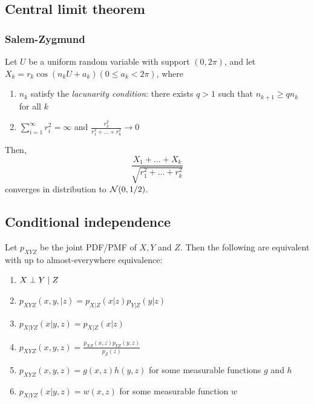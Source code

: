 \documentclass[10pt]{article}
\begin{document}
\subsection{Central limit theorem}
\subsubsection{Salem-Zygmund}
 Let $U$ be a uniform random variable with support $(0, 2\pi)$, and let $X_k = r_k \cos(n_k U + a_k) (0 \leq a_k < 2\pi)$, where 
\begin{enumerate}
    \item $n_k$ satisfy the \emph{lacunarity condition}: there exists $q>1$ such that $n_{k+1} \geq q n_k$ for all $k$ 
    \item $\sum_{i=1}^\infty r_i^2 = \infty$ and $\frac{r_k^2}{r_1^2 + \dots +r_k^2} \to 0$  
\end{enumerate}
Then, 
\begin{equation}
    \frac{X_1 + \dots +X_k}{\sqrt{r_1^2 + \dots + r_k^2}}
\end{equation}
converges in distribution to $\mathcal{N}(0, 1/2)$. 
\subsection{Conditional independence}
 Let $p_{X Y Z}$ be the joint PDF/PMF of $X,Y$ and $Z$. Then the following are equivalent with up to almost-everywhere equivalence:
\begin{enumerate}
    \item $X \perp Y \given Z$
    \item $p_{XY Z } (x,y,|z) = p_{X|Z}(x|z) p_{Y|Z}(y|z)$
    \item $p_{X|Y Z}(x|y,z) = p_{X|Z}(x|z)$
    \item $p_{XYZ}(x,y,z) = \frac{p_{XZ} (x,z) p_{YZ}(y,z)}{p_Z (z)}$
    \item $p_{XYZ} (x,y,z) = g(x,z) h(y,z)$ for some measurable functions $g$ and $h$
    \item $p_{X|Y Z} (x | y,z) = w(x,z)$ for some measurable function $w$ \\ 
\end{enumerate} 
\end{document}
